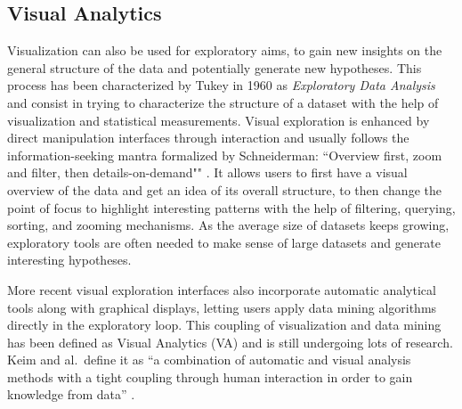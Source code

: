

\subsection{Visual Analytics}

Visualization can also be used for exploratory aims, to gain new insights on the general structure of the data and potentially generate new hypotheses.
This process has been characterized by Tukey in 1960 as \emph{Exploratory Data Analysis} \cite{tukeyExploratoryDataAnalysis1977} and consist in trying to characterize the structure of a dataset with the help of visualization and statistical measurements.
Visual exploration is enhanced by direct manipulation interfaces through interaction and usually follows the information-seeking mantra formalized by Schneiderman: ``Overview first, zoom and filter, then details-on-demand"" \cite{shneidermanEyesHaveIt1996}.
It allows users to first have a visual overview of the data and get an idea of its overall structure, to then change the point of focus to highlight interesting patterns with the help of filtering, querying, sorting, and zooming mechanisms.
As the average size of datasets keeps growing, exploratory tools are often needed to make sense of large datasets and generate interesting hypotheses.

More recent visual exploration interfaces also incorporate automatic analytical tools along with graphical displays, letting users apply data mining algorithms directly in the exploratory loop.
This coupling of visualization and data mining has been defined as Visual Analytics (VA) and is still undergoing lots of research.
Keim and al.\ define it as ``a combination of automatic and visual analysis methods with a tight coupling through human interaction in order to gain knowledge from data'' \cite{keimVisualAnalyticsDefinition2008}.

